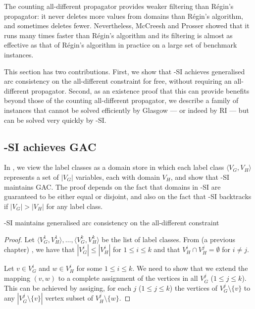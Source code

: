 The counting all-different propagator provides weaker filtering than
R\'egin's propagator: it never deletes more values from domains than R\'egin's algorithm, and sometimes
deletes fewer. Nevertheless, McCreesh and Prosser showed that it runs many times faster than
R\'egin's algorithm and its filtering is almost as effective as that of R\'egin's algorithm in practice
on a large set of benchmark instances.

This section has two contributions. First, we show that \McSplit-SI achieves generalised arc consistency
on the all-different constraint for free, without requiring an all-different propagator.
Second, as an existence proof that this can provide benefits beyond those of the counting all-different
propagator, we describe
a family of instances that cannot be solved efficiently by Glasgow --- or indeed by RI --- but can
be solved very quickly by \McSplit-SI.

\subsection{\McSplit-SI achieves GAC}

In , we view the label classes as a domain store in which each label
class $\langle V_G, V_H \rangle$ represents a set of $|V_G|$ variables, each with domain $V_H$,
and show that \McSplit-SI maintains GAC.  The proof depends on the fact that domains in
\McSplit-SI are guaranteed to be
either equal or disjoint, and also on the fact that \McSplit-SI backtracks if $|V_G| > |V_H|$
for any label class.

\begin{proposition}\label{gacProposition}
    \McSplit-SI maintains generalised arc consistency on the all-different constraint
\end{proposition}

\begin{proof}
Let $\langle V_G^1, V_H^1 \rangle, \dots, \langle V_G^k, V_H^k \rangle$ be the list of
label classes.  From (a previous chapter) , we have that $|V_G^i| \leq |V_H^i|$
for $1 \leq i \leq k$ and that $V_H^i \cap V_H^j = \emptyset$ for $i \not= j$.

Let $v \in V_G^i$ and $w \in V_H^i$ for some $1 \leq i \leq k$.  We need to show that we
extend the mapping
$(v,w)$ to a complete assignment of the vertices in all $V_G^j$ ($1 \leq j \leq k$).
This can be achieved by assiging, for each $j$ ($1 \leq j \leq k$) the vertices of
$V_G^j \setminus \{v\}$ to any $|V_G^j \setminus \{v\}|$ vertex subset of
$V_H^j \setminus \{w\}$.
\end{proof}

